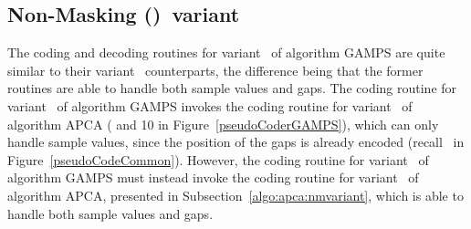 \subsection{Non-Masking (\NOmaskalgo)\ variant}
\label{algo:gamps:nmvariant}


The coding and decoding routines for variant \NOmaskalgo\ of algorithm GAMPS are quite similar to their variant \maskalgo\ counterparts, the difference being that the former routines are able to handle both sample values and gaps. The coding routine for variant \maskalgo\ of algorithm GAMPS invokes the coding routine for variant \maskalgo\ of algorithm APCA ( and 10 in Figure~\ref{pseudoCoderGAMPS}), which can only handle sample values, since the position of the gaps is already encoded (recall \Line \gapLine\ in Figure~\ref{pseudoCodeCommon}). However, the coding routine for variant \NOmaskalgo\ of algorithm GAMPS must instead invoke the coding routine for variant \NOmaskalgo\ of algorithm APCA, presented in Subsection~\ref{algo:apca:nmvariant}, which is able to handle both sample values and gaps.

